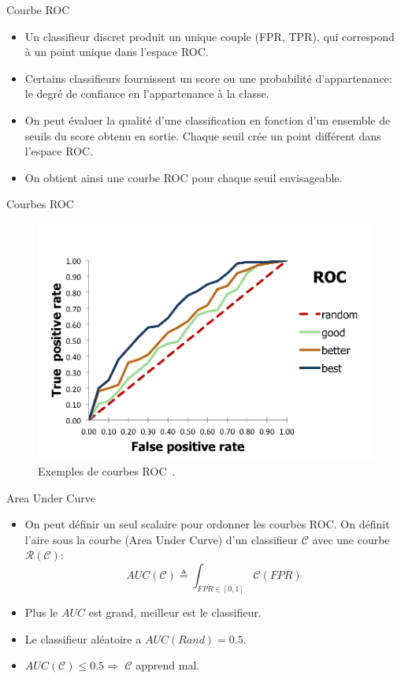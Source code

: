 \documentclass[8pt]{beamer}
\begin{document}
			\begin{frame}{Courbe ROC}
				\begin{itemize}
					\item<1-> Un classifieur discret produit un unique couple (FPR, TPR), qui correspond à un point unique dans l’espace ROC.
					\item<2-> Certains classifieurs fournissent un score ou une probabilité d’appartenance: le degré de confiance en l’appartenance à la classe.
					\item<3-> On peut évaluer la qualité d'une classification en fonction d'un ensemble de seuils du score obtenu en sortie. Chaque seuil crée un point différent dans l'espace ROC.
					\item<4-> On obtient ainsi une courbe ROC pour chaque seuil envisageable.
				\end{itemize}
			\end{frame}
			\begin{frame}{Courbes ROC}
				\begin{figure}[H]
					\includegraphics[width=.6\textwidth]{images/samples/roc_curves.png}
					\caption*{Exemples de courbes ROC~\cite{ROCS}.}
				\end{figure}
			\end{frame}
			\begin{frame}{Area Under Curve}
				\begin{itemize}
					\item<1-> On peut définir un seul scalaire pour ordonner les courbes ROC. On définit l'aire sous la courbe (Area Under Curve) d'un classifieur \(\mathscr{C}\) avec une courbe \(\mathscr{R}(\mathscr{C})\):
					\begin{equation}
						AUC(\mathscr{C}) \triangleq \int_{FPR\in[0,1]} \mathscr{C}(FPR)
					\end{equation}
					\item<2-> Plus le \(AUC\) est grand, meilleur est le classifieur.
					\item<3-> Le classifieur aléatoire a \(AUC(Rand) = 0.5\).
					\item<4->\(AUC(\mathscr{C}) \leq 0.5 \Longrightarrow\) \(\mathscr{C}\) apprend mal.
				\end{itemize}
			\end{frame}
\end{document}
